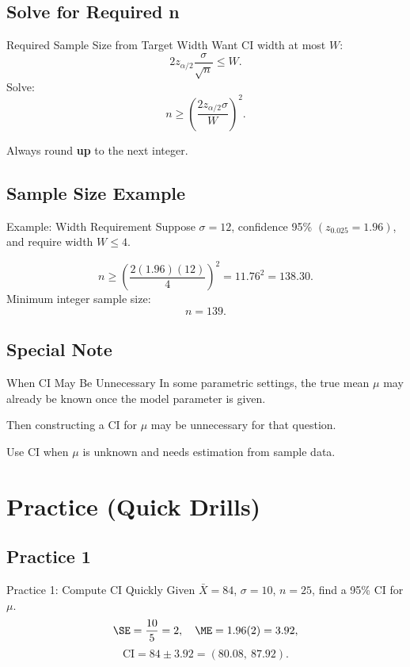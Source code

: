 \documentclass[aspectratio=169]{beamer}
\begin{document}
\subsection{Solve for Required n}
\begin{frame}{Required Sample Size from Target Width}
  Want CI width at most \(W\):
  \[
    2z_{\alpha/2}\frac{\sigma}{\sqrt{n}}\le W.
  \]
  Solve:
  \[
    n\ge \left(\frac{2z_{\alpha/2}\sigma}{W}\right)^2.
  \]

  \vspace{2mm}
  Always round \textbf{up} to the next integer.
\end{frame}

\subsection{Sample Size Example}
\begin{frame}{Example: Width Requirement}
  Suppose \(\sigma=12\), confidence 95\% \((z_{0.025}=1.96)\),
  and require width \(W\le 4\).

  \[
    n\ge \left(\frac{2(1.96)(12)}{4}\right)^2
    =11.76^2
    =138.30.
  \]
  Minimum integer sample size:
  \[
    n=139.
  \]
\end{frame}

\subsection{Special Note}
\begin{frame}{When CI May Be Unnecessary}
  In some parametric settings, the true mean \(\mu\) may already be known
  once the model parameter is given.

  \vspace{2mm}
  Then constructing a CI for \(\mu\) may be unnecessary for that question.

  \vspace{2mm}
  Use CI when \(\mu\) is unknown and needs estimation from sample data.
\end{frame}

\section{Practice (Quick Drills)}

\subsection{Practice 1}
\begin{frame}{Practice 1: Compute CI Quickly}
  Given \(\bar X=84\), \(\sigma=10\), \(n=25\), find a 95\% CI for \(\mu\).
  \pause
  \[
    \SE=\frac{10}{5}=2,
    \quad
    \ME=1.96(2)=3.92,
  \]
  \[
    \text{CI}=84\pm 3.92=(80.08,\ 87.92).
  \]
\end{frame}
\end{document}
